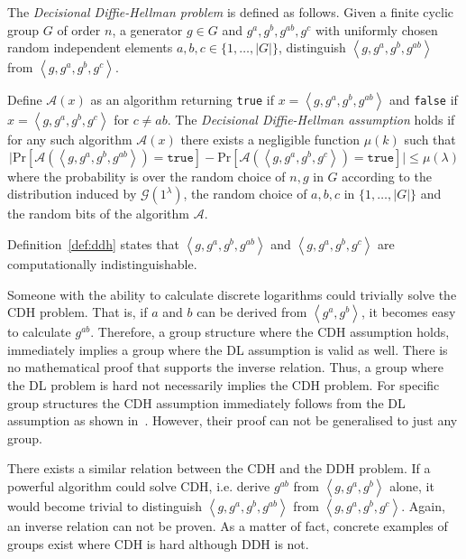 \begin{defn}[DDH]
\label{def:ddh}
The \textit{Decisional Diffie-Hellman problem} is defined as follows. Given a finite cyclic group $G$ of order $n$, a generator $g \in G$ and $g^a, g^b, g^{ab}, g^c$ with uniformly chosen random independent elements $a, b, c \in \{ 1, \ldots, | G |\}$, distinguish $\left< g, g^a, g^b, g^{ab} \right>$ from $\left< g, g^a, g^b, g^c \right>$.

Define $\mathcal{A} \left( x \right)$ as an algorithm returning \texttt{true} if $x = \left< g, g^a, g^b, g^{ab} \right>$ and \texttt{false} if $x = \left< g, g^a, g^b, g^c \right>$ for $c \neq ab$. The \textit{Decisional Diffie-Hellman assumption} holds if for any such algorithm $\mathcal{A} \left( x \right)$ there exists a negligible function $\mu \left( k \right)$ such that 
 \begin{equation*}
  \lvert \textrm{Pr} \left[ \mathcal{A} \left( \left< g, g^a, g^b, g^{ab} \right> \right) = \texttt{true} \right] - \textrm{Pr} \left[ \mathcal{A} \left( \left< g, g^a, g^b, g^{c} \right> \right) = \texttt{true} \right] \rvert \leq \mu \left( \lambda \right)
 \end{equation*}
 where the probability is over the random choice of $n, g$ in $G$ according to the distribution induced by $\mathcal{G} \left( 1^{\lambda} \right)$, the random choice of $a, b, c$ in $\{ 1, \ldots, | G | \} $ and the random bits of the algorithm $\mathcal{A}$.
\end{defn}

Definition~\ref{def:ddh} states that $\left< g, g^a, g^b, g^{ab} \right>$ and $\left< g, g^a, g^b, g^{c} \right>$ are computationally indistinguishable.

Someone with the ability to calculate discrete logarithms could trivially solve the CDH problem. That is, if $a$ and $b$ can be derived from $\left< g^a, g^b \right>$, it becomes easy to calculate $g^{ab}$. Therefore, a group structure where the CDH assumption holds, immediately implies a group where the DL assumption is valid as well. There is no mathematical proof that supports the inverse relation. Thus, a group where the DL problem is hard not necessarily implies the CDH problem. For specific group structures the CDH assumption immediately follows from the DL assumption as shown in~\cite{art:MaurerW98,art:MaurerW99}. However, their proof can not be generalised to just any group.

There exists a similar relation between the CDH and the DDH problem. If a powerful algorithm could solve CDH, i.e. derive $g^{ab}$ from $\left< g, g^a, g^b \right>$ alone, it would become trivial to distinguish $\left< g, g^a, g^b, g^{ab} \right>$ from $\left< g, g^a, g^b, g^c \right>$. Again, an inverse relation can not be proven. As a matter of fact, concrete examples of groups exist where CDH is hard although DDH is not.

